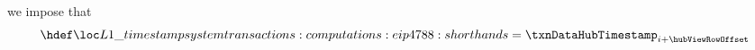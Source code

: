 \item[\underline{\underline{Setting the time stamp}}]
	we impose that
	\[
		\locLayerOneTimeStamp
		=
		\txnDataHubTimestamp _{i + \hubViewRowOffset}
	\]
